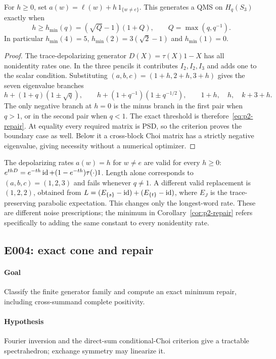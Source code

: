 \begin{corollary}\label{cor:p2-repair}
For $h\geq0$, set $a(w)=\ell(w)+h\,1_{\{w\ne e\}}$. This generates
a QMS on $H_q(S_3)$ exactly when
\begin{equation}\label{eq:p2-repair}
 h\geq h_{\min}(q)=(\sqrt Q-1)(1+Q),\qquad Q=\max(q,q^{-1}).
\end{equation}
In particular $h_{\min}(4)=5$, $h_{\min}(2)=3(\sqrt2-1)$ and
$h_{\min}(1)=0$.
\end{corollary}
\begin{proof}
The trace-depolarizing generator $D(X)=\tau(X)1-X$ has all nonidentity
rates one. In the three pencils it contributes $I_2,I_2,I_3$ and adds
one to the scalar condition. Substituting $(a,b,c)=(1+h,2+h,3+h)$ gives
the seven eigenvalue branches
\[
 h+(1+q)(1\pm\sqrt q),\qquad
 h+(1+q^{-1})(1\pm q^{-1/2}),\qquad
 1+h,\quad h,\quad k+3+h.
\]
The only negative branch at $h=0$ is the minus branch in the first pair
when $q>1$, or in the second pair when $q<1$. The exact threshold is
therefore~\eqref{eq:p2-repair}. At equality every required matrix is PSD,
so the criterion proves the boundary case as well. Below it a cross-block
Choi matrix has a strictly negative eigenvalue, giving necessity without
a numerical optimizer.
\end{proof}

The depolarizing rates $a(w)=h$ for $w\ne e$ are valid for every $h\geq0$:
$e^{t hD}=e^{-th}\operatorname{id}+(1-e^{-th})\tau(\cdot)1$. Length alone corresponds
to $(a,b,c)=(1,2,3)$ and fails whenever $q\ne1$.
A different valid replacement is $(1,2,2)$, obtained from
$L=(E_{\{s\}}-\operatorname{id})+(E_{\{t\}}-\operatorname{id})$, where $E_J$ is the
trace-preserving parabolic expectation. This changes only the longest-word
rate. These are different noise prescriptions; the minimum in
Corollary~\ref{cor:p2-repair} refers specifically to adding the same
constant to every nonidentity rate.

\subsection{E004: exact cone and repair}
\paragraph{Goal} Classify the finite generator family and compute an exact
minimum repair, including cross-summand complete positivity.
\paragraph{Hypothesis} Fourier inversion and the direct-sum conditional-Choi
criterion give a tractable spectrahedron; exchange symmetry may linearize it.
